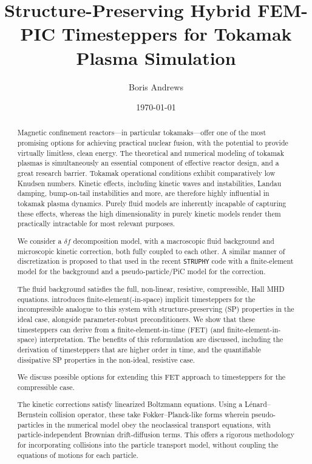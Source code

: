 \documentclass[12pt, a4paper]{report}
\title{Structure-Preserving Hybrid FEM-PIC Timesteppers for Tokamak Plasma Simulation}
\author{Boris Andrews}
\affil{Mathematical Institute, University of Oxford}
\date{\today}
\begin{document}
    \maketitle
    
    
    \begin{abstract}
        Magnetic confinement reactors---in particular tokamaks---offer one of the most promising options for achieving practical nuclear fusion, with the potential to provide virtually limitless, clean energy. The theoretical and numerical modeling of tokamak plasmas is simultaneously an essential component of effective reactor design, and a great research barrier. Tokamak operational conditions exhibit comparatively low Knudsen numbers. Kinetic effects, including kinetic waves and instabilities, Landau damping, bump-on-tail instabilities and more, are therefore highly influential in tokamak plasma dynamics. Purely fluid models are inherently incapable of capturing these effects, whereas the high dimensionality in purely kinetic models render them practically intractable for most relevant purposes.

        We consider a $\delta\!f$ decomposition model, with a macroscopic fluid background and microscopic kinetic correction, both fully coupled to each other. A similar manner of discretization is proposed to that used in the recent {\tt STRUPHY} code \cite{Holderied_Possanner_Wang_2021, Holderied_2022, Li_et_al_2023} with a finite-element model for the background and a pseudo-particle/PiC model for the correction.

        The fluid background satisfies the full, non-linear, resistive, compressible, Hall MHD equations. \cite{Laakmann_Hu_Farrell_2022} introduces finite-element(-in-space) implicit timesteppers for the incompressible analogue to this system with structure-preserving (SP) properties in the ideal case, alongside parameter-robust preconditioners. We show that these timesteppers can derive from a finite-element-in-time (FET) (and finite-element-in-space) interpretation. The benefits of this reformulation are discussed, including the derivation of timesteppers that are higher order in time, and the quantifiable dissipative SP properties in the non-ideal, resistive case.
        
        We discuss possible options for extending this FET approach to timesteppers for the compressible case.

        The kinetic corrections satisfy linearized Boltzmann equations. Using a Lénard--Bernstein collision operator, these take Fokker--Planck-like forms \cite{Fokker_1914, Planck_1917} wherein pseudo-particles in the numerical model obey the neoclassical transport equations, with particle-independent Brownian drift-diffusion terms. This offers a rigorous methodology for incorporating collisions into the particle transport model, without coupling the equations of motions for each particle.
        

\end{abstract}
\end{document}
